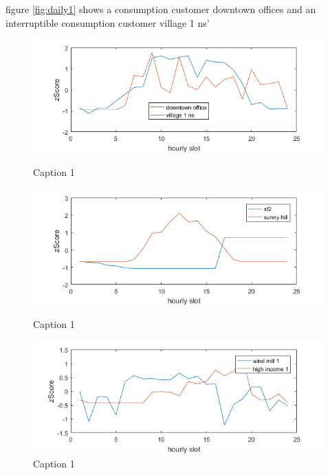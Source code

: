 figure \ref{fig:daily1} shows a consumption customer downtown offices and an interruptible consumption customer village 1 ns' 
 
\begin{figure}[!h]
\centering
\includegraphics{daily1.png}
\caption{Caption 1}
\label{fig:daily1}
\includegraphics{daily2.png}
\caption{Caption 1}
\label{fig:daily2}
\includegraphics{daily3.png}
\caption{Caption 1}
\label{fig:daily3}
\end{figure}

